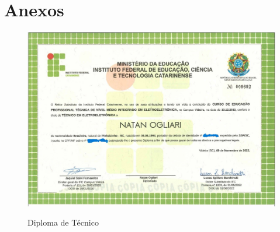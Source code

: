 

\section{Anexos}
\begin{figure}[H]
        \centering
        \caption{Diploma de Técnico}
        \includegraphics[width=1\textwidth]{figure/Doc/Diploma frente.jpg}
        \label{fig:diploma}
\end{figure}